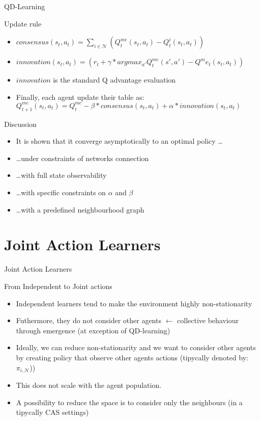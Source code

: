 \documentclass[presentation]{beamer}\mode<presentation>{\usetheme{AMSBolognaFC}}
\begin{document}
\begin{frame}{QD-Learning}
	\begin{exampleblock}{Update rule}
		\begin{itemize}
			\item $consensus(s_t, a_t) = \sum_{i \in \mathcal{N}} (Q^{me}_t(s_t, a_t) - Q^i_t(s_t, a_t))$
			\item $innovation(s_t, a_t) = (r_t + \gamma*argmax_{a'}Q^{me}_t(s', a') - Q^me_t(s_t, a_t))$
			\item $innovation$ is the standard Q advantage evaluation
			\item Finally, each agent update their table as: $Q^{me}_{t + 1}(s_t, a_t) = Q^{me}_t - \beta * consensus(s_t, a_t) + \alpha * innovation(s_t, a_t)$
		\end{itemize}		
	\end{exampleblock}
	\begin{alertblock}{Discussion}
		\begin{itemize}
			\item[{\color{teal} \faThumbsUp}] It is shown that it converge asymptotically to an optimal policy \dots
			\item[{\color{red} \faThumbsDown}]\dots under constraints of networks connection
			\item[{\color{red} \faThumbsDown}]\dots with full state observability
			\item[{\color{red} \faThumbsDown}]\dots with specific constraints on $\alpha$ and $\beta$ 
			\item[{\color{red} \faThumbsDown}]\dots with a predefined neighbourhood graph 
		\end{itemize}
	\end{alertblock}
\end{frame}
\section{Joint Action Learners}

\begin{frame}{Joint Action Learners}
	\begin{alertblock}{From Independent to Joint actions}	
		\begin{itemize}
			\item Independent learners tend to make the environment highly non-stationarity
			\item Futhermore, they do not consider other agents $\leftarrow$ collective behaviour through emergence (at exception of QD-learning)
			\item Ideally, we can reduce non-stationarity and we want to consider other agents by creating policy that observe other agents actions (tipycally denoted by: $\pi_{i,\mathcal{N}}$))
			\item This does not scale with the agent population.
			\item A possibility to reduce the space is to consider only the neighbours (in a tipycally CAS settings)
		\end{itemize}
	\end{alertblock}
\end{frame}
\end{document}
